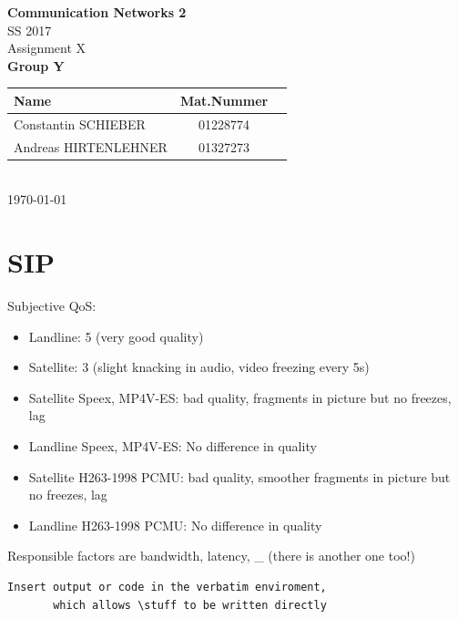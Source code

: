 \documentclass[parskip=full]{scrartcl}
\begin{document}
\begin{titlepage}
    \centering
    \vspace*{2cm}
    {\Huge \textbf{Communication Networks 2}}\\
    SS 2017\\
    \vspace*{1cm}
    {\Large Assignment X}
    \\\vspace*{3cm}
    {\Large \textbf{Group Y}}\\
    \vspace*{1cm}
    {\large 
        \begin{tabular}{l c c}
            Name & Mat.Nummer \\ \hline
            Constantin SCHIEBER & 01228774 \\
            Andreas HIRTENLEHNER & 01327273
        \end{tabular}
    }
    \\\vspace*{7cm}
    \today
\end{titlepage}

\section{SIP}

Subjective QoS:
\begin{itemize}
	\item Landline: 5 (very good quality)
	\item Satellite: 3 (slight knacking in audio, video freezing every 5s)
	\item Satellite Speex, MP4V-ES: bad quality, fragments in picture but no freezes, lag
	\item Landline Speex, MP4V-ES: No difference in quality
	\item Satellite H263-1998 PCMU: bad quality, smoother fragments in picture but no freezes, lag
	\item Landline H263-1998 PCMU: No difference in quality
\end{itemize}
Responsible factors are bandwidth, latency, _ (there is another one too!)

\begin{verbatim}
Insert output or code in the verbatim enviroment,
       which allows \stuff to be written directly
\end{verbatim}
\end{document}
